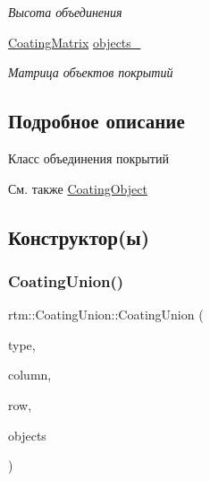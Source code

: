 \begin{DoxyCompactItemize}
\begin{DoxyCompactList}\small\item\em Высота объединения \end{DoxyCompactList}\item 
\mbox{\label{classrtm_1_1_coating_union_a805afd44081afec9f4e286436be1a735}} 
\hyperlink{namespacertm_ae3bb29510cfde424975be31866d2486e}{Coating\+Matrix} \hyperlink{classrtm_1_1_coating_union_a805afd44081afec9f4e286436be1a735}{objects\+\_\+}
\begin{DoxyCompactList}\small\item\em Матрица объектов покрытий \end{DoxyCompactList}\end{DoxyCompactItemize}


\subsection{Подробное описание}
Класс объединения покрытий 

\begin{DoxySeeAlso}{См. также}
\hyperlink{classrtm_1_1_coating_object}{Coating\+Object} 
\end{DoxySeeAlso}


\subsection{Конструктор(ы)}
\mbox{\label{classrtm_1_1_coating_union_ad5c97fb37269028e9058c37c10428255}} 
\subsubsection{\texorpdfstring{Coating\+Union()}{CoatingUnion()}}
{\footnotesize\ttfamily rtm\+::\+Coating\+Union\+::\+Coating\+Union (\begin{DoxyParamCaption}\item[{\hyperlink{namespacertm_a6a0d424be5696f64038e5e84a79cabfa}{Coating\+Union\+Type}}]{type,  }\item[{int}]{column,  }\item[{int}]{row,  }\item[{\hyperlink{namespacertm_ae3bb29510cfde424975be31866d2486e}{Coating\+Matrix} \&\&}]{objects }\end{DoxyParamCaption})}



